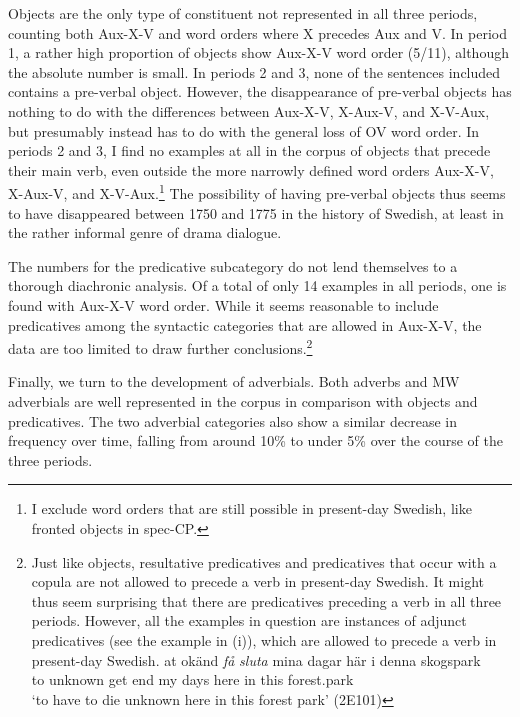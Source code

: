 \documentclass[output=paper, colorlinks, citecolor=brown]{langscibook}
\begin{document}
Objects are the only type of constituent not represented in all three periods, counting both Aux-X-V and word orders where X precedes Aux and V. In period 1, a rather high proportion of objects show Aux-X-V word order (5/11), although the absolute number is small. In periods 2 and 3, none of the sentences included contains a pre-verbal object. However, the disappearance of pre-verbal objects has nothing to do with the differences between Aux-X-V, X-Aux-V, and X-V-Aux, but presumably instead has to do with the general loss of OV word order. In periods 2 and 3, I find no examples at all in the corpus of objects that precede their main verb, even outside the more narrowly defined word orders Aux-X-V, X-Aux-V, and X-V-Aux.\footnote{I exclude word orders that are still possible in present-day Swedish, like fronted objects in spec-CP.} The possibility of having pre-verbal objects thus seems to have disappeared between 1750 and 1775 in the history of Swedish, at least in the rather informal genre of drama dialogue.



The numbers for the predicative subcategory do not lend themselves to a thorough diachronic analysis. Of a total of only 14 examples in all periods, one is found with Aux-X-V word order. While it seems reasonable to include predicatives among the syntactic categories that are allowed in Aux-X-V, the data are too limited to draw further conclusions.\footnote{Just like objects, resultative predicatives and predicatives that occur with a copula are not allowed to precede a verb in present-day Swedish. It might thus seem surprising that there are predicatives preceding a verb in all three periods. However, all the examples in question are instances of adjunct predicatives (see the example in (i)), which are allowed to precede a verb in present-day Swedish.  
\ea \gll at okänd \textit{få} \textit{sluta} mina  dagar  här  i  denna  skogspark\\
         to unknown  get  end  my  days  here  in  this  forest.park\\
     \glt ‘to have to die unknown here in this forest park’ (2E101)
\z}



Finally, we turn to the development of adverbials. Both adverbs and MW adverbials are well represented in the corpus in comparison with objects and predicatives. The two adverbial categories also show a similar decrease in frequency over time, falling from around 10\% to under 5\% over the course of the three periods.\largerpage[3]
\end{document}
